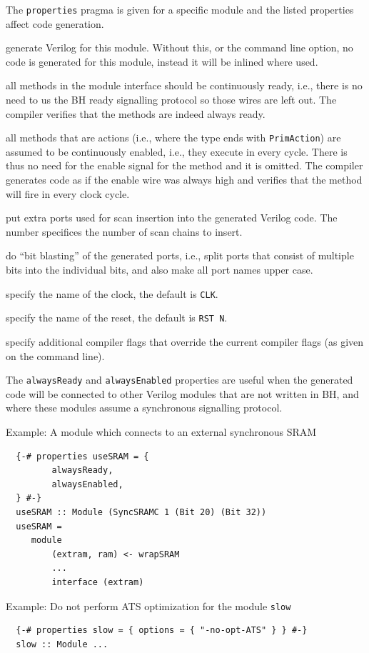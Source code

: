 \documentclass[twoside,letterpaper]{article}
\newcommand{\BH}{BH}
\newcommand{\veri}{Verilog}
\newcommand{\ttsymbol}[1]{%
  \begingroup\fontfamily{cmtt}\selectfont\symbol{#1}\endgroup
}
\newcommand{\US}{\ttsymbol{95}}
\newcommand{\te}[1]{\texttt{#1}}
\newcommand{\begindescrlist}[1]{
\begin{list}{\arabic{enumi}}{
                \settowidth{\labelwidth}{#1}
                \setlength{\leftmargin}{\labelwidth} %
                \addtolength{\leftmargin}{\labelsep}
                \setlength{\parsep}{0ex}
                \setlength{\itemsep}{0ex}
                \usecounter{enumi}
        }
}
\newcommand{\litem}[1]{\item[#1\hfill]}
\begin{document}
The \te{properties} pragma is given for a specific module and the listed
properties affect code generation.
\begindescrlist{alwaysEnabledxx}
\litem{\te{verilog}}
generate {\veri} for this module.  Without this, or the command line option,
no code is generated for this module, instead it will be inlined where used.
\litem{\te{alwaysReady}}
all methods in the module interface should be continuously ready, i.e., there
is no need to us the {\BH} ready signalling protocol so those wires are left
out.  The compiler verifies that the methods are indeed always ready.
\litem{\te{alwaysEnabled}}
all methods that are actions (i.e., where the type ends with \te{PrimAction})
are assumed to be continuously enabled, i.e., they execute in every cycle.
There is thus no need for the enable signal for the method and it is omitted.
The compiler generates code as if the enable wire was always high and verifies
that the method will fire in every clock cycle.
\litem{\te{scanInsert}}
put extra ports used for scan insertion into the generated {\veri} code.
The number specifices the number of scan chains to insert.
\litem{\te{bitBlast}}
do ``bit blasting'' of the generated ports, i.e., split ports that consist of
multiple bits into the individual bits, and also make all port names upper case.
\litem{\te{CLK}}
specify the name of the clock, the default is \te{CLK}.
\litem{\te{RSTN}}
specify the name of the reset, the default is \te{RST{\US}N}.
\litem{\te{options}}
specify additional compiler flags that override the current compiler flags
(as given on the command line).
\end{list}

The \te{alwaysReady} and \te{alwaysEnabled} properties are useful when the generated
code will be connected to other {\veri} modules that are not written in {\BH},
and where these modules assume a synchronous signalling protocol.

Example: A module which connects to an external synchronous SRAM
\begin{verbatim}
  {-# properties useSRAM = {
         alwaysReady,
         alwaysEnabled,
  } #-}
  useSRAM :: Module (SyncSRAMC 1 (Bit 20) (Bit 32))
  useSRAM =
     module
         (extram, ram) <- wrapSRAM
         ...
         interface (extram)
\end{verbatim}

Example: Do not perform ATS optimization for the module \te{slow}
\begin{verbatim}
  {-# properties slow = { options = { "-no-opt-ATS" } } #-}
  slow :: Module ...
\end{verbatim}
\end{document}
